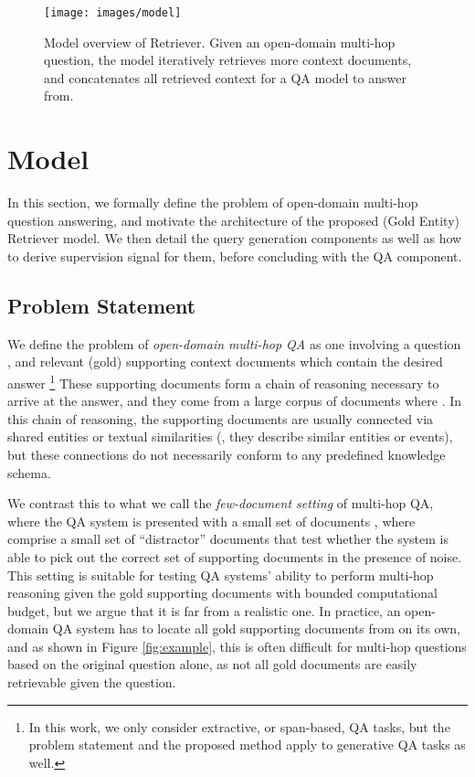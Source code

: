 \begin{figure*}[!ht]
    \centering
    \texttt{[image: images/model]}
    \caption{Model overview of \golden{} Retriever.
    Given an open-domain multi-hop question, the model iteratively retrieves more context documents, and concatenates all retrieved context for a QA model to answer from.}
    \label{fig:model}
\end{figure*}

\section{Model}

In this section, we formally define the problem of open-domain multi-hop question answering, and motivate the architecture of the proposed \golden{} (Gold Entity) Retriever model.
We then detail the query generation components as well as how to derive supervision signal for them, before concluding with the QA component.

\subsection{Problem Statement}

We define the problem of \emph{open-domain multi-hop QA} as one involving a question , and  relevant (gold) supporting context documents  which contain the desired answer \footnote{In this work, we only consider extractive, or span-based, QA tasks, but the problem statement and the proposed method apply to generative QA tasks as well.}
These supporting documents form a chain of reasoning necessary to arrive at the answer, and they come from a large corpus of documents  where .
In this chain of reasoning, the supporting documents are usually connected via shared entities or textual similarities (\eg, they describe similar entities or events), but these connections do not necessarily conform to any predefined knowledge schema.

We contrast this to what we call the \emph{few-document setting} of multi-hop QA, where the QA system is presented with a small set of documents , where  comprise a small set of ``distractor'' documents that test whether the system is able to pick out the correct set of supporting documents in the presence of noise.
This setting is suitable for testing QA systems' ability to perform multi-hop reasoning given the gold supporting documents with bounded computational budget, but we argue that it is far from a realistic one.
In practice, an open-domain QA system has to locate all gold supporting documents from  on its own, and as shown in Figure \ref{fig:example}, this is often difficult for multi-hop  questions based on the original question alone, as not all gold documents are easily retrievable given the question.

